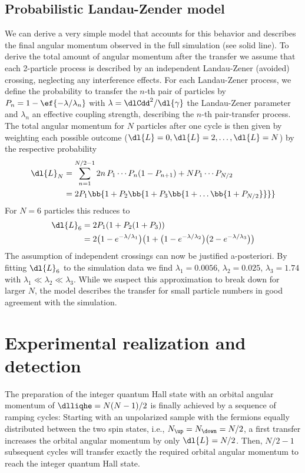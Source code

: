 \subsection{Probabilistic Landau-Zender model}
We can derive a very simple model that accounts for this behavior and describes the final angular momentum observed in the full simulation (see solid line).
To derive the total amount of angular momentum after the transfer we assume that each 2-particle process is described by an independent Landau-Zener (avoided) crossing, neglecting any interference effects. For each Landau-Zener process, we define the probability to transfer the $n$-th pair of particles by $P_n = 1-\ef{-\lambda/\lambda_n}$ with $\lambda=\dlCdd^2/\dl{\gamma}$ the Landau-Zener parameter and $\lambda_n$ an effective coupling strength, describing the $n$-th pair-transfer process. The total angular momentum for $N$ particles after one cycle is then given by weighting each possible outcome ($\dl{L}=0,\dl{L}=2,\dots,\dl{L}=N$) by the respective probability
\begin{align}
\dl{L}_N&=\sum_{n=1}^{N/2-1} 2n \,P_1\cdots P_n (1-P_{n+1})+N P_1\cdots P_{N/2}\\
&=2P_1\bb{1+P_2\bb{1+P_3\bb{1+\dots\bb{1+P_{N/2}}}}}
\end{align}
For $N=6$ particles this reduces to
\begin{align}
\dl{L}_6&=2 P_1(1+P_2(1+P_3))\\
&=2 \big(1-e^{-\lambda/\lambda_1}\big) \big(1+\big(1-e^{-\lambda/\lambda_2}\big) \big(2-e^{-\lambda/\lambda_3}\big)\big)
\end{align}
The assumption of independent crossings can now be justified a-posteriori. By fitting $\dl{L}_6$ to the simulation data we find $\lambda_1=0.0056$, $\lambda_2=0.025$, $\lambda_3=1.74$ with $\lambda_1 \ll \lambda_2 \ll \lambda_3$. While we suspect this approximation to break down for larger $N$, the model describes the transfer for small particle numbers in good agreement with the simulation.

\section{Experimental realization and detection}

The preparation of the integer quantum Hall state with an orbital angular momentum of $\dlliqhe = N(N-1)/2$ is finally achieved by a sequence of ramping cycles: Starting with an unpolarized sample with the fermions equally distributed between the two spin states, i.e.,  $N_\up=N_\down=N/2$, a first transfer increases the orbital angular momentum by only $\dl{L}=N/2$. Then, $N/2-1$ subsequent cycles will transfer exactly the required orbital angular momentum to reach the integer quantum Hall state.

